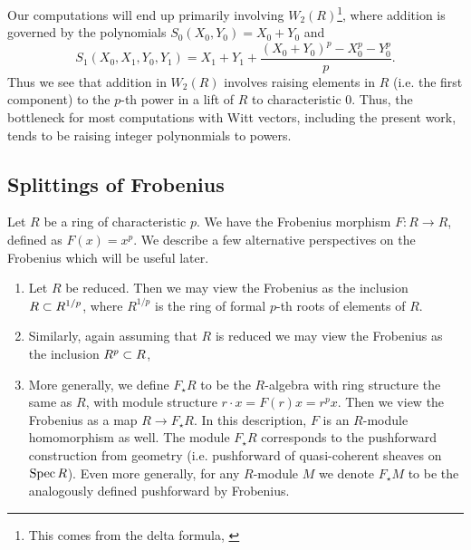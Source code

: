 \begin{rmk}
	\label{rmk:polyraise:w2}
    Our computations will end up primarily involving
    \(W_{2}(R)\)\footnote{
    This comes from the delta formula,
    \cite[Theorem~D]{kty-2022-fedder}},
    where addition is governed by the polynomials
	\(S_{0}(X_{0}, Y_{0}) = X_{0} + Y_{0}\)
	and
	\[
		S_{1}(X_{0}, X_{1}, Y_{0}, Y_{1})
		= X_{1} + Y_{1} + 
		\frac{(X_{0} + Y_{0})^{p} - X_{0}^{p} - Y_{0}^{p}}{p}
	.\] 
	Thus we see that addition in \(W_{2}(R)\) involves raising 
	elements in \(R\) (i.e. the first component) to the \(p\)-th
	power in a lift of \(R\) to characteristic 0.
    Thus, the bottleneck for most computations with Witt vectors,
    including the present work, tends to be raising
    integer polynonmials to powers.
\end{rmk}

\subsection{Splittings of Frobenius}
\label{subsec:split:frob}

Let \(R\) be a ring of characteristic \(p\). 
We have the Frobenius morphism 
\(F \colon R \xrightarrow{} R\), 
defined as \(F(x) = x^p\).
We describe a few alternative perspectives on
the Frobenius which will be useful later.

\begin{rmk}
	\label{rmk:frob:perspectives}
    \hfill
    \begin{enumerate}[(1)]
    	\item Let \(R\) be reduced. 
    		Then we may view the Frobenius as the inclusion
    		\(R \subset R^{1 / p}\), where \(R^{1 / p}\) 
    		is the ring of formal \(p\)-th roots of elements
    		of \(R\).
    	\item Similarly, again assuming that \(R\) is reduced
    		we may view the Frobenius as the inclusion
    		\(R^{p} \subset R\), 
    	\item More generally, we define \(F_{\star}R\) to
			be the \(R\)-algebra with ring structure 
			the same as \(R\), with module structure
			\(r \cdot x = F(r)x = r^{p}x\).
			Then we view the Frobenius as a map
			\(R \xrightarrow{} F_{\star}R\).
			In this description, \(F\) is an \(R\)-module 
			homomorphism as well. 
			The module \(F_{\star}R\) corresponds to the
			pushforward construction from geometry
			(i.e. pushforward of quasi-coherent
			sheaves on \(\operatorname{Spec} R\)).
			Even more generally, for any \(R\)-module
			\(M\) we denote \(F_{\star}M\) to be
			the analogously defined pushforward by
			Frobenius.
    \end{enumerate}
\end{rmk}

